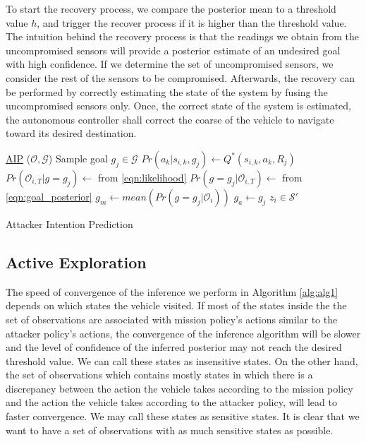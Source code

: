 \documentclass[letterpaper, 10 pt, conference]{ieeeconf}  %
\begin{document}
To start the recovery process, we compare the posterior mean to a threshold value $h$, and trigger the recover process if  it is higher than the threshold value. The intuition behind the recovery process is that the readings we obtain from the uncompromised sensors will provide a posterior estimate of an undesired goal with high confidence. If we determine the set of uncompromised sensors, we consider the rest of the sensors to be compromised. Afterwards, the recovery can be performed by correctly estimating the state of the system by fusing the uncompromised sensors only. Once, the correct state of the system is estimated, the autonomous controller shall correct the coarse of the vehicle to navigate toward its desired destination.
\begin{algorithm}\label{alg:alg1}
    \underline{AIP} ($\mathcal{O}, \mathcal{G}$)\;
    {
        {
            Sample goal $g_j \in \mathcal{G}$\;
            { 
                $Pr(a_k|s_{i,k},g_j) \leftarrow Q^*(s_{i,k},a_k,R_j)$\;
            }
            $Pr(\mathcal{O}_{i,T}|g=g_j) \leftarrow$  from \ref{eqn:likelihood}\;
            $Pr(g=g_j|\mathcal{O}_{i,T}) \leftarrow$ from \ref{eqn:goal_posterior}\;
        }
        $g_m \leftarrow mean(Pr(g=g_j|\mathcal{O}_i))$\;
        {
            $g_a \leftarrow g_j$\;
            $z_i \in \mathcal{S}'$\;
        }
    }
    \caption{Attacker Intention Prediction}
\end{algorithm}

\subsection{Active Exploration}
The speed of convergence of the inference we perform in Algorithm \ref{alg:alg1} depends on which states the vehicle visited. If most of the states inside the the set of observations are associated with mission policy's actions similar to the attacker policy's actions, the convergence of the inference algorithm will be slower and the level of confidence of the inferred posterior may not reach the desired threshold value. We can call these states as insensitive states. On the other hand, the set of observations which contains mostly states in which there is a discrepancy between the action the vehicle takes according to the mission policy and the action the vehicle takes according to the attacker policy, will lead to faster convergence. We may call these states as sensitive states. It is clear that we want to have a set of observations with as much sensitive states as possible.
\end{document}
